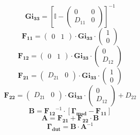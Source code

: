 \[ \mathbf{Gi_{33}} = \left[\mathbb{I} -\left(\begin{smallmatrix} 0 &
0 \\ D_{11} & 0 \end{smallmatrix}\right)\right]^{-1} \]
\[ \mathbf{F_{11}} = \left(\begin{smallmatrix} 0 & 1
\end{smallmatrix}\right) \cdot\mathbf{Gi_{33}}\cdot
\left(\begin{smallmatrix} 1 \\ 0 \end{smallmatrix}\right) \]
\[ \mathbf{F_{12}} = \left(\begin{smallmatrix} 0 & 1
\end{smallmatrix}\right) \cdot\mathbf{Gi_{33}}\cdot
\left(\begin{smallmatrix} 0 \\ D_{12} \end{smallmatrix}\right) \]
\[ \mathbf{F_{21}} = \left(\begin{smallmatrix} D_{21} & 0
\end{smallmatrix}\right) \cdot\mathbf{Gi_{33}}\cdot
\left(\begin{smallmatrix} 1 \\ 0 \end{smallmatrix}\right) \]
\[ \mathbf{F_{22}} = \left(\begin{smallmatrix} D_{21} & 0
\end{smallmatrix}\right) \cdot\mathbf{Gi_{33}}\cdot
\left(\begin{smallmatrix} 0 \\ D_{12} \end{smallmatrix}\right) +
D_{22} \]
\[ \mathbf{B}=\mathbf{F_{12}}^{-1}\cdot\left[ \mathbf{\Gamma_{msd}} -
\mathbf{F_{11}} \right]  \]
\[ \mathbf{A}=\mathbf{F_{21}}+ \mathbf{F_{22}}\cdot\mathbf{B} \]
\[ \mathbf{\Gamma_{dut}} = \mathbf{B} \cdot \mathbf{A}^{-1} \]
